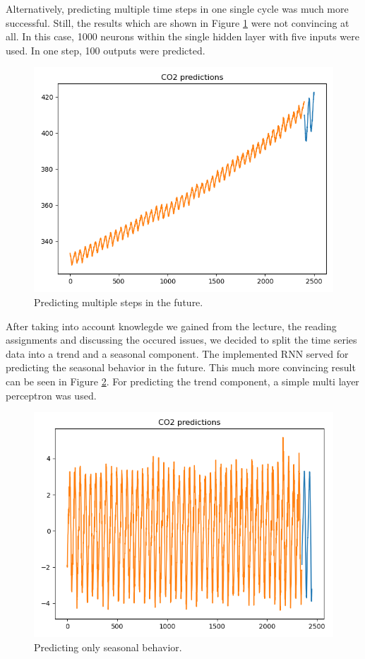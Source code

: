 Alternatively, predicting multiple time steps in one single cycle was much more successful. Still, the results which are shown in Figure \ref{fig:RNN2} were not convincing at all. In this case, 1000 neurons within the single hidden layer with five inputs were used. In one step, 100 outputs were predicted.

\begin{figure}[hb!]
	\centering
	\includegraphics[width=0.7\linewidth]{./RNN_athmospheric _CO2_prediction/1000neurons_5inputs_100_outputs.jpg}
	\caption{\co Predicting multiple steps in the future.}
	\label{fig:RNN2}
\end{figure}

After taking into account knowlegde we gained from the lecture, the reading assignments and discussing the occured issues, we decided to split the time series data into a trend and a seasonal component. The implemented RNN served for predicting the seasonal behavior in the future. This much more convincing result can be seen in Figure \ref{fig:RNN3}. For predicting the trend component, a simple multi layer perceptron was used.

\begin{figure}[hb!]
	\centering
	\includegraphics[width=0.7\linewidth]{./RNN_athmospheric _CO2_prediction/seasonal_predictions}
	\caption{\co Predicting only seasonal behavior.}
	\label{fig:RNN3}
\end{figure}
